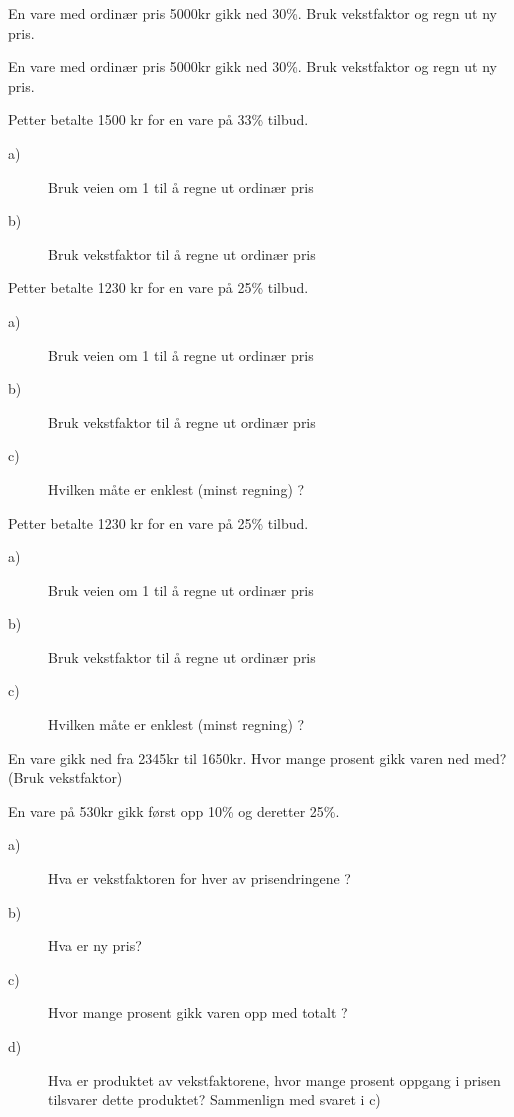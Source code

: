 \documentclass[a4, 11pt, twoside]{article}
\theoremstyle{definition}
\begin{document}
\begin{Exercise}
  En vare med ordinær pris 5000kr gikk ned 30\%. Bruk vekstfaktor og regn ut ny pris.
\end{Exercise}

\begin{Exercise}
  En vare med ordinær pris 5000kr gikk ned 30\%. Bruk vekstfaktor og regn ut ny pris.
\end{Exercise}


\begin{Exercise}
  Petter betalte 1500 kr for en vare på 33\% tilbud. 
  \begin{description}
    \item[a)] Bruk veien om 1 til å regne ut ordinær pris
    \item[b)] Bruk vekstfaktor til å regne ut ordinær pris
  \end{description}
\end{Exercise}


\begin{Exercise}
  Petter betalte 1230 kr for en vare på 25\% tilbud. 
  \begin{description}
    \item[a)] Bruk veien om 1 til å regne ut ordinær pris
    \item[b)] Bruk vekstfaktor til å regne ut ordinær pris
    \item[c)] Hvilken måte er enklest (minst regning) ?
  \end{description}
\end{Exercise}



\begin{Exercise}
  Petter betalte 1230 kr for en vare på 25\% tilbud. 
  \begin{description}
    \item[a)] Bruk veien om 1 til å regne ut ordinær pris
    \item[b)] Bruk vekstfaktor til å regne ut ordinær pris
    \item[c)] Hvilken måte er enklest (minst regning) ?
  \end{description}
\end{Exercise}


\begin{Exercise}
  En vare gikk ned fra 2345kr til 1650kr.
  Hvor mange prosent gikk varen ned med? (Bruk vekstfaktor)
\end{Exercise}

\begin{Exercise}
  En vare på 530kr gikk først opp 10\% og deretter 25\%.
  \begin{description}
    \item[a)] Hva er vekstfaktoren for hver av prisendringene ?
    \item[b)] Hva er ny pris?
    \item[c)] Hvor mange prosent gikk varen opp med totalt ?
    \item[d)] Hva er produktet av vekstfaktorene, hvor mange prosent oppgang i prisen tilsvarer dette produktet? Sammenlign
      med svaret i c)
  \end{description}
\end{Exercise}
\end{document}
